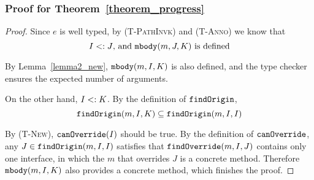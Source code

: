 \subsubsection{Proof for Theorem~\ref{theorem_progress}}
\begin{proof}
	
Since $e$ is well typed, by \textsc{(T-PathInvk)} and \textsc{(T-Anno)} we know that
$$I <: J\textrm{, and }\texttt{mbody}(m, J, K) \textrm{ is defined}$$

By Lemma~\ref{lemma2_new}, $\texttt{mbody}(m, I, K)$ is also defined, and the type checker ensures the expected number of arguments.

On the other hand, $I <: K$. By the definition of $\texttt{findOrigin}$, $$\texttt{findOrigin}(m, I, K) \subseteq \texttt{findOrigin}(m, I, I)$$

By \textsc{(T-New)}, $\texttt{canOverride}(I)$ should be true. By the definition of $\texttt{canOverride}$, any $J\in\texttt{findOrigin}(m, I, I)$ satisfies that
$\texttt{findOverride}(m, I, J)$ contains only one interface, in which the $m$ that overrides $J$ is a concrete method. Therefore $\texttt{mbody}(m, I, K)$ also provides a concrete method, which finishes the proof.
\end{proof}
